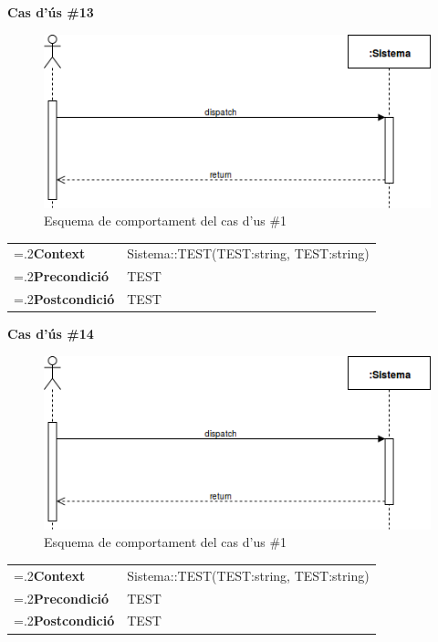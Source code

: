 \clearpage
\noindent\textbf{\large Cas d'ús \#13}\\
\begin{figure}[H]
\centering
\includegraphics[scale=0.6]{Figures/casdus_00.png}
\caption{Esquema de comportament del cas d'us \#1}
\end{figure}
\begin{table}[h]
\noindent
\begin{tabularx}{\linewidth}{
>{\hsize=.2\hsize}X%
>{\hsize=0.8\hsize}X%
}
\textbf{Context} 		& Sistema::TEST(TEST:string, TEST:string) \\
\textbf{Precondició} 	& TEST \\
\textbf{Postcondició}	& TEST \\
\end{tabularx}
\label{}
\end{table}

\noindent\textbf{\large Cas d'ús \#14}\\
\begin{figure}[H]
\centering
\includegraphics[scale=0.6]{Figures/casdus_00.png}
\caption{Esquema de comportament del cas d'us \#1}
\end{figure}
\begin{table}[h]
\noindent
\begin{tabularx}{\linewidth}{
>{\hsize=.2\hsize}X%
>{\hsize=0.8\hsize}X%
}
\textbf{Context} 		& Sistema::TEST(TEST:string, TEST:string) \\
\textbf{Precondició} 	& TEST \\
\textbf{Postcondició}	& TEST \\
\end{tabularx}
\label{}
\end{table}

